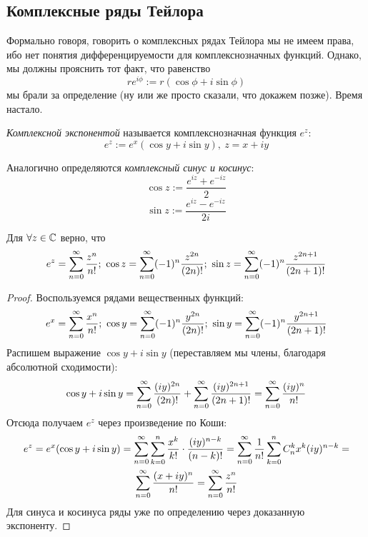 \subsection{Комплексные ряды Тейлора}

\begin{note}
	Формально говоря, говорить о комплексных рядах Тейлора мы не имеем права, ибо нет понятия дифференцируемости для комплекснозначных функций. Однако, мы должны прояснить тот факт, что равенство
	\[
		re^{i\phi} := r(\cos \phi + i\sin \phi)
	\]
	мы брали за определение (ну или же просто сказали, что докажем позже). Время настало.
\end{note}

\begin{definition}
	\textit{Комплексной экспонентой} называется комплекснозначная функция $e^z$:
	\[
		e^z := e^x (\cos y + i \sin y),\ z = x + iy
	\]
\end{definition}

\begin{note}
	Аналогично определяются \textit{комплексный синус и косинус}:
	\[
		\cos z := \frac{e^{iz} + e^{-iz}}{2}
	\]
	\[
		\sin z := \frac{e^{iz} - e^{-iz}}{2i}
	\]
\end{note}

\begin{theorem}
	Для $\forall z \in \mathbb{C}$ верно, что
	\[
		e^z = \sum_{n = 0}^\infty \frac{z^n}{n!};\ \cos z = \sum_{n = 0}^\infty (-1)^n \frac{z^{2n}}{(2n)!};\ \sin z = \sum_{n = 0}^\infty (-1)^n \frac{z^{2n + 1}}{(2n + 1)!}
	\]
\end{theorem}

\begin{proof}
	Воспользуемся рядами вещественных функций:
	\[
		e^x = \sum_{n = 0}^\infty \frac{x^n}{n!};\ \cos y = \sum_{n = 0}^\infty (-1)^n \frac{y^{2n}}{(2n)!};\ \sin y = \sum_{n = 0}^\infty (-1)^n \frac{y^{2n + 1}}{(2n + 1)!}
	\]
	Распишем выражение $\cos y + i\sin y$ (переставляем мы члены, благодаря абсолютной сходимости):
	\[
		\cos y + i\sin y = \sum_{n = 0}^\infty \frac{(iy)^{2n}}{(2n)!} + \sum_{n = 0}^\infty \frac{(iy)^{2n + 1}}{(2n + 1)!} = \sum_{n = 0}^\infty \frac{(iy)^n}{n!}
	\]
	Отсюда получаем $e^z$ через произведение по Коши:
	\begin{multline*}
		e^z = e^x(\cos y + i\sin y) = \sum_{n = 0}^\infty \sum\limits_{k = 0}^n \frac{x^k}{k!} \cdot \frac{(iy)^{n - k}}{(n - k)!} = \sum_{n = 0}^\infty \frac{1}{n!}\sum\limits_{k = 0}^n C_n^k x^k (iy)^{n - k} =
		\\
		\sum_{n = 0}^\infty \frac{(x + iy)^n}{n!} = \sum_{n = 0}^\infty \frac{z^n}{n!}
	\end{multline*}
	Для синуса и косинуса ряды уже по определению через доказанную экспоненту.
\end{proof}

